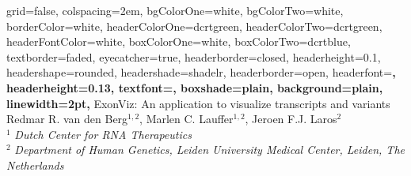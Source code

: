 \documentclass[portrait,a0paper,fontscale=0.31]{baposter}
\newcommand{\fcite}[2]{#1$^#2$}
\begin{document}


\begin{poster}%
  {
  grid=false,
  colspacing=2em,
  bgColorOne=white,
  bgColorTwo=white,
  borderColor=white,
  headerColorOne=dcrtgreen,
  headerColorTwo=dcrtgreen,
  headerFontColor=white,
  boxColorOne=white,
  boxColorTwo=dcrtblue,
  textborder=faded,
  eyecatcher=true,
  headerborder=closed,
  headerheight=0.1\textheight,
  headershape=rounded,
  headershade=shadelr,
  headerborder=open,
  headerfont=\Large\sf\bf, %
  headerheight=0.13\textheight,
  textfont={\setlength{\parindent}{1.5em}},
  boxshade=plain,
  background=plain,
  linewidth=2pt,
  }
  {}
  {
    {
      ExonViz: An application to visualize transcripts and variants
    }
  }
  {
    {
      \fcite{Redmar R. van den Berg}{{1,2}}, \fcite{Marlen C. Lauffer}{{1,2}}, \fcite{Jeroen F.J. Laros}{{2}}
      \\{\smaller $^1$ \textit{Dutch Center for RNA Therapeutics}}
      \\{\smaller $^2$ \textit{Department of Human Genetics, Leiden University Medical Center, Leiden, The Netherlands}}
    }
  }


\end{poster}
\end{document}
